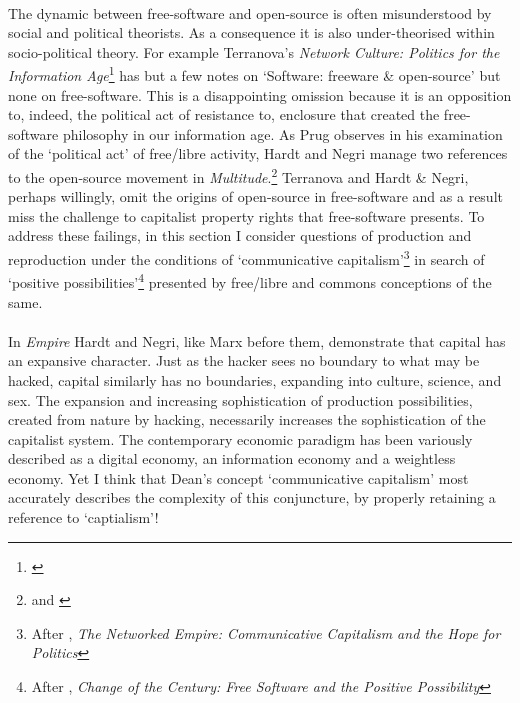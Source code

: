 \documentclass[11pt,titlepage]{book}
\begin{document}
\paragraph{}The dynamic between free-software and open-source is often misunderstood by social and political theorists. As a consequence it is also under-theorised within socio-political theory. For example Terranova's \textit{Network Culture: Politics for the Information Age}\footnote{\cite{Terranova:2004ly}} has but a few notes on  `Software: freeware \& open-source' but none on free-software. This is a disappointing omission because it is an opposition to, indeed, the political act of resistance to, enclosure that created the free-software philosophy in our information age. As Prug observes in his examination of the `political act' of free/libre activity, Hardt and Negri manage two references to the open-source movement in \textit{Multitude}.\footnote{\cite[`Hackers and the Protestant ethics']{Prug:2007fs} and \cite[p. 301 \& pp. 339-40]{Hardt:2005zt}} Terranova and Hardt \& Negri, perhaps willingly, omit the origins of open-source in free-software and as a result miss the challenge to capitalist property rights that free-software presents. To address these failings, in this section I consider questions of production and reproduction under the conditions of `communicative capitalism'\footnote{After \cite{dean:2005cc}, \textit{The Networked Empire: Communicative Capitalism and the Hope for Politics}} in search of `positive possibilities'\footnote{After \cite{Hardie:2005px}, \textit{Change of the Century: Free Software and the Positive Possibility}} presented by free/libre and commons conceptions of the same.

\paragraph{}In \textit{Empire} Hardt and Negri, like Marx before them, demonstrate that capital has an expansive character. Just as the hacker sees no boundary to what may be hacked, capital similarly has no boundaries, expanding into culture, science, and sex. The expansion and increasing sophistication of production possibilities, created from nature by hacking, necessarily increases the sophistication of the capitalist system. The contemporary economic paradigm has been variously described as a digital economy, an information economy and a weightless economy. Yet I think that Dean's concept `communicative capitalism' most accurately describes the complexity of this conjuncture, by properly retaining a reference to `captialism'!
\end{document}
